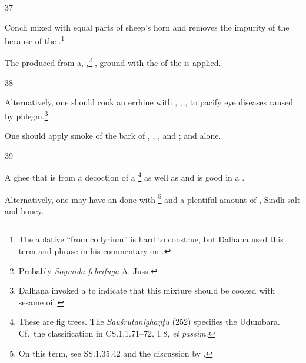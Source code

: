 \begin{translation}
    \item [37]
    
    Conch mixed with equal parts of sheep's horn and  removes the
    impurity of the  because of the .\footnote{The ablative “from collyrium” is hard to construe, but 
    Ḍalhaṇa used this term and phrase in his commentary on .}
    
    
    
    The  produced from 
    a,
    ,\footnote{Probably \emph{Soymida febrifuga} A. Juss.}
    ,
    ground with the  of the  is 
    applied. 
    
    \item[38]
    
    Alternatively, one should cook an errhine with 
    ,
    ,
    ,
     to pacify eye diseases caused by 
    phlegm.\footnote{Ḍalhaṇa invoked a  to indicate that 
    this mixture should be cooked with sesame oil. }
    
    
    
    One should apply smoke of the bark of
    ,
    ,
    ,
    and
    ; and
     alone.
    
    \item[39] 
    
    A ghee that is  from a decoction of a
    \footnote{These are fig trees.  The 
    \emph{Sauśrutanighaṇṭu} (252) specifies the Uḍumbara. Cf.\ the classification in
    CS.1.1.71--72, 1.8, \emph{et passim}.}
    as well as 
    and 
    is good in a 
    . 
    
    
    
    Alternatively, one may have an  done with
    \footnote{On this term, see SS.1.35.42 
    \citep[157]{vulgate} and the discussion by
    \citet[25--31]{zimm-1999}.} 
    and a plentiful amount of , Sindh salt and honey.
    

\end{translation}
